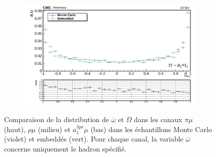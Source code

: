 \begin{figure}
\begin{subfigure}[b]{0.5\linewidth}
    \caption*{} 
    \vspace{0.5ex}
  \end{subfigure}%
  \begin{subfigure}[b]{0.5\linewidth}
    \centering
    \includegraphics[width=\linewidth]{Chapitre6/Images/OptVar/Omegabar_a1tauh.png} 
    \caption*{} 
    \vspace{0.5ex}
  \end{subfigure}
  \caption{Comparaison de la distribution de $\overline{\omega}$ et $\overline{\Omega}$ dans les canaux $\pi\mu$ (haut), $\rho\mu$ (milieu) et $a_1^{3pr}\mu$ (bas) dans les échantillons Monte Carlo (violet) et embeddés (vert). Pour chaque canal, la variable $\overline{\omega}$ concerne uniquement le hadron spécifié.}
  \label{omegabar_tautau}
\end{figure}

